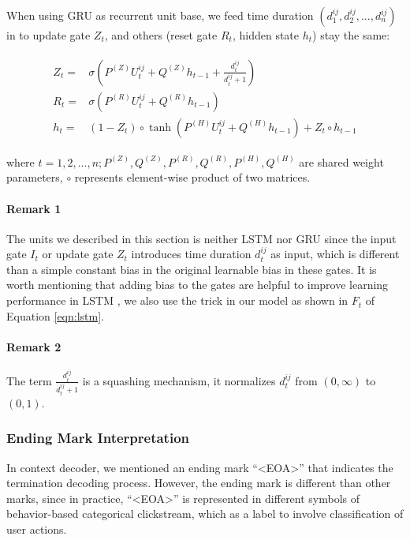 When using GRU as recurrent unit base, we feed time duration $(d^{ij}_1, d^{ij}_2, ..., d^{ij}_n)$
in to update gate $Z_t$, and others (reset gate $R_t$, hidden state $h_t$) stay the same:

\begin{align}
\label{eqn:lstm}
\begin{split}
    Z_t =& \sigma ( P^{(Z)} U^{ij}_t + Q^{(Z)} h_{t-1} + \frac{d^{ij}_t}{d^{ij}_t + 1} ) \\
    R_t =& \sigma ( P^{(R)} U^{ij}_t + Q^{(R)} h_{t-1} ) \\
    h_t =& ( 1 - Z_t ) \circ \tanh ( P^{(H)} U^{ij}_t + Q^{(H)} h_{t-1} ) + Z_t \circ h_{t-1}
\end{split}
\end{align}

where $t = 1, 2, ..., n; P^{(Z)}, Q^{(Z)}, P^{(R)}, Q^{(R)}, P^{(H)}, Q^{(H)}$ are shared weight parameters, 
$\circ$ represents element-wise product of two matrices.

\paragraph{Remark 1} The units we described in this section is neither LSTM nor GRU since
the input gate $I_t$ or update gate $Z_t$ introduces time duration $d^{ij}_t$ as input,
which is different than a simple constant bias in the original learnable bias in these gates. 
It is worth mentioning that adding bias to the gates are helpful to 
improve learning performance in LSTM \cite{Jozefowicz:2015:EER:3045118.3045367}, 
we also use the trick in our model as shown in $F_t$ of Equation \ref{eqn:lstm}.

\paragraph{Remark 2} The term $\frac{d^{ij}_t}{d^{ij}_t + 1}$ is a squashing mechanism,
it normalizes $d^{ij}_t$ from $(0, \infty)$ to $(0, 1)$.

\subsubsection{Ending Mark Interpretation}
\label{sec:mark-interpretation}

In context decoder, we mentioned an ending mark ``<EOA>'' that indicates the termination 
decoding process. However, the ending mark is different than other marks, since in practice,
``<EOA>'' is represented in different symbols of behavior-based categorical clickstream, which as a label to
involve classification of user actions.

